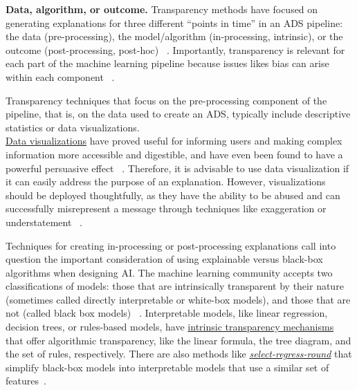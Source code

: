 \textbf{Data, algorithm, or outcome.} Transparency methods have focused on generating explanations for three different ``points in time'' in an ADS pipeline:  the data (pre-processing), the model/algorithm (in-processing, intrinsic), or the outcome (post-processing, post-hoc) ~\cite{DBLP:journals/jmlr/AryaBCDHHHLLMMP20, ventocilla2018towards}.  Importantly, transparency is relevant for each part of the machine learning pipeline because issues likes bias can arise within each component ~\cite{yang2020fairness}.

Transparency techniques that focus on the pre-processing component of the pipeline, that is, on the data used to create an ADS, typically include descriptive statistics or data visualizations.\\  
\underline{Data visualizations} have proved useful for informing users and making complex information more accessible and digestible, and have even been found to have a powerful persuasive effect ~\cite{DBLP:journals/tvcg/PandeyMNSB14, tal2016blinded}. Therefore, it is advisable to use data visualization if it can easily  address the purpose of an explanation. However, visualizations should be deployed thoughtfully, as they have the ability to be abused and can successfully misrepresent a message through techniques like exaggeration or understatement ~\cite{pandey2015deceptive}.

Techniques for creating in-processing or post-processing explanations call into question the important consideration of using explainable versus black-box algorithms when designing AI. The machine learning community accepts two classifications of models:  those that are intrinsically transparent by their nature (sometimes called directly interpretable or white-box models), and those that are not (called black box models) ~\cite{DBLP:journals/corr/abs-2012-01805}. Interpretable models, like linear regression, decision trees, or rules-based models, have \underline{intrinsic transparency mechanisms} that offer algorithmic transparency, like the linear formula, the tree diagram, and the set of rules, respectively. There are also methods like \underline{\emph{select-regress-round}} that simplify black-box models into interpretable models that use a similar set of features~\cite{jung2017simple}.


